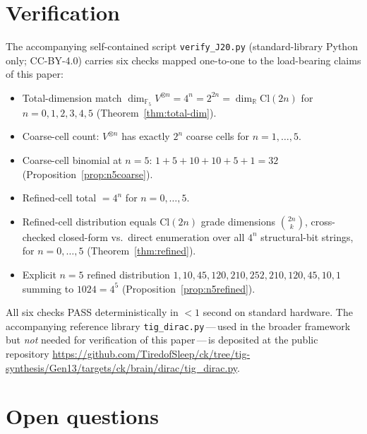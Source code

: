 \documentclass[11pt,reqno]{amsart}
\theoremstyle{plain}
\theoremstyle{definition}
\theoremstyle{remark}
\newcommand{\F}{\mathbb{F}}
\newcommand{\R}{\mathbb{R}}
\newcommand{\Cl}{\mathrm{Cl}}
\begin{document}
\section{Verification}

The accompanying self-contained script \texttt{verify\_J20.py}
(standard-library Python only; CC-BY-4.0) carries six checks mapped
one-to-one to the load-bearing claims of this paper:
\begin{itemize}
\item[C1.] Total-dimension match $\dim_{\F_5} V^{\otimes n} =
4^n = 2^{2n} = \dim_\R \Cl(2n)$ for $n = 0, 1, 2, 3, 4, 5$
(Theorem~\ref{thm:total-dim}).
\item[C2.] Coarse-cell count: $V^{\otimes n}$ has exactly $2^n$ coarse
cells for $n = 1, \ldots, 5$.
\item[C3.] Coarse-cell binomial at $n = 5$:
$1 + 5 + 10 + 10 + 5 + 1 = 32$ (Proposition~\ref{prop:n5coarse}).
\item[C4.] Refined-cell total $= 4^n$ for $n = 0, \ldots, 5$.
\item[C5.] Refined-cell distribution equals Cl$(2n)$ grade dimensions
$\binom{2n}{k}$, cross-checked closed-form vs.\ direct enumeration
over all $4^n$ structural-bit strings, for $n = 0, \ldots, 5$
(Theorem~\ref{thm:refined}).
\item[C6.] Explicit $n = 5$ refined distribution
$1, 10, 45, 120, 210, 252, 210, 120, 45, 10, 1$ summing to
$1024 = 4^5$ (Proposition~\ref{prop:n5refined}).
\end{itemize}
All six checks PASS deterministically in $<1$ second on standard
hardware. The accompanying reference library
\texttt{tig\_dirac.py}\,---\,used in the broader framework but
\emph{not} needed for verification of this paper\,---\,is deposited at
the public repository
\url{https://github.com/TiredofSleep/ck/tree/tig-synthesis/Gen13/targets/ck/brain/dirac/tig_dirac.py}.

\section{Open questions}
\label{sec:open}
\end{document}
